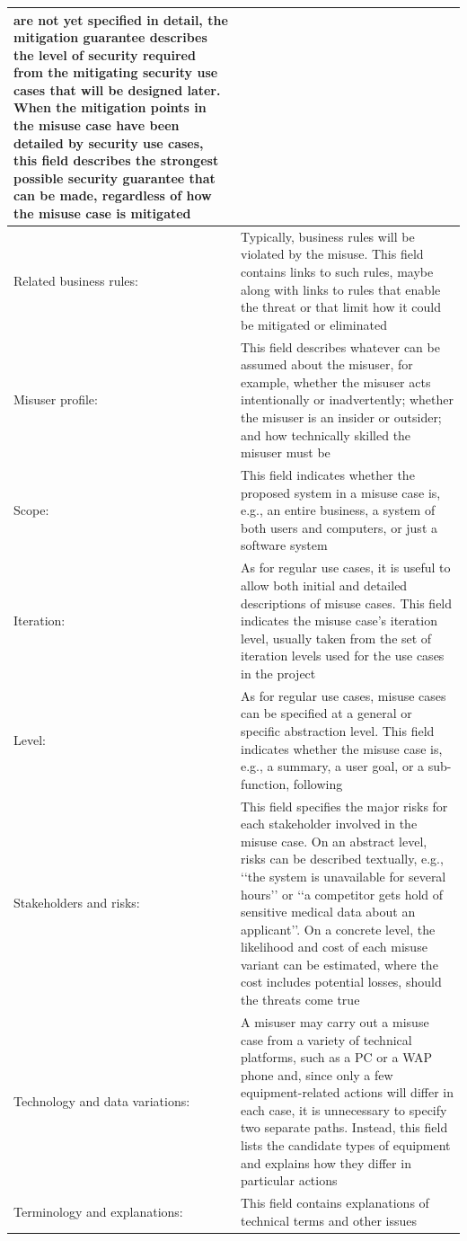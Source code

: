 \begin{table}
\begin{tabular}{p{}p{}}
are not yet specified in detail, the mitigation guarantee describes the level of security required
from the mitigating security use cases that will be designed later. When the mitigation points
in the misuse case have been detailed by security use cases, this field describes the strongest
possible security guarantee that can be made, regardless of how the misuse case is mitigated \\ 
\hline 
Related business rules: & Typically, business rules will be violated by the misuse. This field contains links to
such rules, maybe along with links to rules that enable the threat or that limit
how it could be mitigated or eliminated \\ 
\hline 
Misuser profile: & This field describes whatever can be assumed about the misuser, for example, whether the misuser
acts intentionally or inadvertently; whether the misuser is an insider or outsider; and how
technically skilled the misuser must be \\ 
\hline 
Scope: & This field indicates whether the proposed system in a misuse case is, e.g., an entire business,
a system of both users and computers, or just a software system \\ 
\hline 
Iteration: & As for regular use cases, it is useful to allow both initial and detailed descriptions of misuse
cases. This field indicates the misuse case’s iteration level, usually taken from the set of
iteration levels used for the use cases in the project \\ 
\hline 
Level: & As for regular use cases, misuse cases can be specified at a general or specific
abstraction level. This field indicates whether the misuse case is, e.g., a summary,
a user goal, or a sub-function, following \\ 
\hline 
Stakeholders and risks: & This field specifies the major risks for each stakeholder involved in the misuse case. On an abstract
level, risks can be described textually, e.g., ‘‘the system is unavailable for several hours’’ or
‘‘a competitor gets hold of sensitive medical data about an applicant’’. On a concrete level,
the likelihood and cost of each misuse variant can be estimated, where the cost includes potential
losses, should the threats come true \\ 
\hline 
Technology and data variations: & A misuser may carry out a misuse case from a variety of technical platforms, such as a PC
or a WAP phone and, since only a few equipment-related actions will differ in each case,
it is unnecessary to specify two separate paths. Instead, this field lists the candidate types
of equipment and explains how they differ in particular actions \\ 
\hline 
Terminology and explanations: & This field contains explanations of technical terms and other issues \\ 
\hline 
\end{tabular} 
\end{table}

